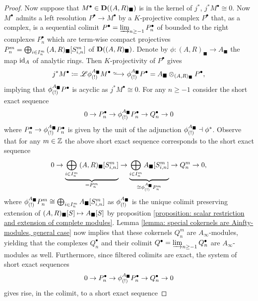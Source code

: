 \begin{proof}
	Now suppose that $M^\bullet \in {{\mathbf{D}}((A, R)_\blacksquare)}$ is in the kernel of $j^\ast$, \ie $j^\ast M^\bullet \cong 0$. Now $M^\bullet$ admits a left resolution $P^\bullet \to M^\bullet$ by a $K$-projective complex $P^\bullet$ that, as a complex, is a sequential colimit $P^\bullet = \varinjlim_{n\ge -1} P^\bullet_n$ of bounded to the right complexes $P^\bullet_n$ which are term-wise compact projectives $P^m_n = \bigoplus_{i \in I^m_n} {(A, R)_\blacksquare[S_{i, n}^m]}$ of ${{\mathbf{D}}((A, R)_\blacksquare)}$. Denote by $\phi\colon (A, R)_\blacksquare \to A_\blacksquare$ the map $\mathrm{id}_A$ of analytic rings. Then $K$-projectivity of $P^\bullet$ gives
	$$j^\ast M^\bullet \ldef \LeftD\completedScalarExtension{\phi}{A_\blacksquare}M^\bullet \isorightarrow \completedScalarExtension{\phi}{A_\blacksquare}P^\bullet = A_\blacksquare \otimes_{(A, R)_\blacksquare} P^\bullet,$$
	implying that ${\phi_{(!)}^{A_\blacksquare}}P^\bullet$ is acyclic as $j^\ast M^\bullet \cong 0$. For any $n\ge -1$ consider the short exact sequence
	$$0\to P_n^\bullet \to {\phi_{(!)}^{A_\blacksquare}}P_n^\bullet \to Q_n^\bullet \to 0$$
	where $P_n^\bullet \to {\phi_{(!)}^{A_\blacksquare}} P_n^\bullet$ is given by the unit of the adjunction ${\phi_{(!)}^{A_\blacksquare}} \dashv {\phi^\ast}$. Observe that for any $m\in {\mathbb{Z}}$ the above short exact sequence corresponds to the short exact sequence
	$$0\to \underbrace{\bigoplus_{i\in I_n^m} {(A, R)_\blacksquare[S_{i, n}^m]}}_{=P_n^m} \to \underbrace{\bigoplus_{i\in I_n^m} {A_\blacksquare[S_{i, n}^m]}}_{\cong {\phi_{(!)}^{A_\blacksquare}}P_n^m} \to Q_n^m \to 0,$$
	where ${\phi_{(!)}^{A_\blacksquare}}P_n^m \cong \bigoplus_{i\in I_n^m} {A_\blacksquare[S_{i, n}^m]}$ as ${\phi_{(!)}^{A_\blacksquare}}$ is the unique colimit preserving extension of ${(A, R)_\blacksquare[S]}\mapsto {A_\blacksquare[S]}$ by proposition \ref{proposition: scalar restriction and extension of complete modules}. Lemma \ref{lemma: special cokernels are Ainfty-modules, general case} now implies that these cokernels $Q_n^m$ are $A_\infty$-modules, yielding that the complexes $Q_n^\bullet$ and their colimit $Q^\bullet = \varinjlim_{n\ge -1} Q_n^\bullet$ are $A_\infty$-modules as well. Furthermore, since filtered colimits are exact, the system of short exact sequences
	$$0\to P_n^\bullet \to {\phi_{(!)}^{A_\blacksquare}}P_n^\bullet \to Q_n^\bullet \to 0$$
	gives rise, in the colimit, to a short exact sequence

\end{proof}
